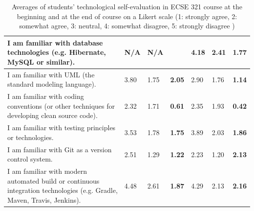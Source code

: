 \documentclass[a4paper,11pt]{report}
\begin{document}
\begin{table}[htb]
\begin{tabular}{@{}p{8cm}p{1cm}p{1cm}p{1cm}p{1cm}p{1cm}p{1cm}@{}}
I am familiar with database technologies (e.g. Hibernate, MySQL or similar). & N/A & N/A & & 
4.18 & 2.41 & \textbf{1.77}  \\ \midrule

I am familiar with UML (the standard modeling language). & 3.80 & 1.75 & \textbf{2.05} & 
2.90 & 1.76 & \textbf{1.14}  \\ \midrule

I am familiar with coding conventions (or other techniques for developing clean source code). & 2.32 & 1.71 & \textbf{0.61} & 2.35 & 1.93 & \textbf{0.42}   \\ \midrule

I am familiar with testing principles or technologies.
& 3.53 & 1.78 & \textbf{1.75} & 3.89 & 2.03 & \textbf{1.86}  \\ \midrule

I am familiar with Git as a version control system.
& 2.51 & 1.29 & \textbf{1.22} & 2.23 & 1.20 & \textbf{2.13}  \\ \midrule

I am familiar with modern automated build or continuous integration technologies (e.g. Gradle, Maven, Travis, Jenkins).
& 4.48 & 2.61 & \textbf{1.87} & 4.29 & 2.13 & \textbf{2.16}  \\ \midrule

\bottomrule
\end{tabular}
\caption{Averages of students' technological self-evaluation in ECSE 321 course at the beginning and at the end of course on a Likert scale (1: strongly agree, 2: somewhat agree, 3: neutral, 4: somewhat disagree, 5: strongly disagree ) }
\label{tab:tech-eval-ecse321}
\end{table}
\end{document}
